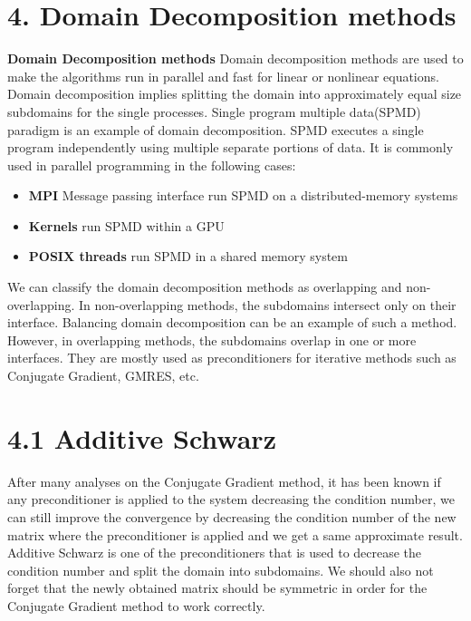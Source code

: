 \documentclass[times]{TRR}
\begin{document}
\section{4. Domain Decomposition methods}
\textbf{Domain Decomposition methods} 
Domain decomposition methods are used to make the algorithms run in parallel and fast for linear or nonlinear equations. Domain decomposition implies splitting the domain into approximately equal size subdomains for the single processes. Single program multiple data(SPMD) paradigm is an example of domain decomposition. SPMD executes a single program independently using multiple separate portions of data. It is commonly used in parallel programming in the following cases:
\begin{itemize}
    \item \textbf{MPI} Message passing interface run SPMD on a distributed-memory systems
    \item \textbf{Kernels} run SPMD within a GPU
    \item \textbf{POSIX threads} run SPMD in a shared memory system
\end{itemize}
We can classify the domain decomposition methods as overlapping and non-overlapping. In non-overlapping methods, the subdomains intersect only on their interface. Balancing domain decomposition can be an example of such a method. However, in overlapping methods, the subdomains overlap in one or more interfaces. They are mostly used as preconditioners for iterative methods such as Conjugate Gradient, GMRES, etc. 
\section{4.1 Additive Schwarz}
After many analyses on the Conjugate Gradient method, it has been known if any preconditioner is applied to the system decreasing the condition number, we can still improve the convergence by decreasing the condition number of the new matrix where the preconditioner is applied and we get a same approximate result. Additive Schwarz is one of the preconditioners that is used to decrease the condition number and split the domain into subdomains. We should also not forget that the newly obtained matrix should be symmetric in order for the Conjugate Gradient method to work correctly.
\end{document}
